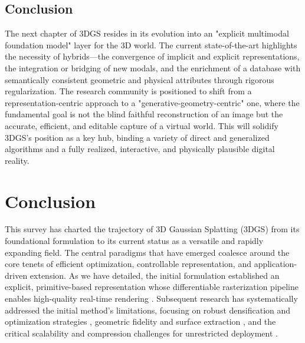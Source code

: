 \documentclass[11pt,a4paper]{article}
\begin{document}
\subsection{Conclusion}


The next chapter of 3DGS resides in its evolution into an "explicit multimodal foundation model" layer for the 3D world. The current state-of-the-art highlights the necessity of hybrids---the convergence of implicit and explicit representations, the integration or bridging of new modals, and the enrichment of a database with semantically consistent geometric and physical attributes through rigorous regularization. The research community is positioned to shift from a representation-centric approach to a "generative-geometry-centric" one, where the fundamental goal is not the blind faithful reconstruction of an image but the accurate, efficient, and editable capture of a virtual world. This will solidify 3DGS's position as a key hub, binding a variety of direct and generalized algorithms and a fully realized, interactive, and physically plausible digital reality.


\section{Conclusion}


This survey has charted the trajectory of 3D Gaussian Splatting (3DGS) from its foundational formulation \cite{arxiv:2308.04079v1} to its current status as a versatile and rapidly expanding field. The central paradigms that have emerged coalesce around the core tenets of efficient optimization, controllable representation, and application-driven extension. As we have detailed, the initial formulation established an explicit, primitive-based representation whose differentiable rasterization pipeline enables high-quality real-time rendering \cite{arxiv:2308.04079v1}. Subsequent research has systematically addressed the initial method's limitations, focusing on robust densification and optimization strategies \cite{arxiv:2605.07287v2,arxiv:2606.21244v1,arxiv:2509.13938v1}, geometric fidelity and surface extraction \cite{arxiv:2403.17888v1,arxiv:2602.14493v1,arxiv:2406.12080v1}, and the critical scalability and compression challenges for unrestricted deployment \cite{arxiv:2311.12897v1,arxiv:2509.07021v3,arxiv:2501.00342v1,arxiv:2502.19457v1}.
\end{document}
